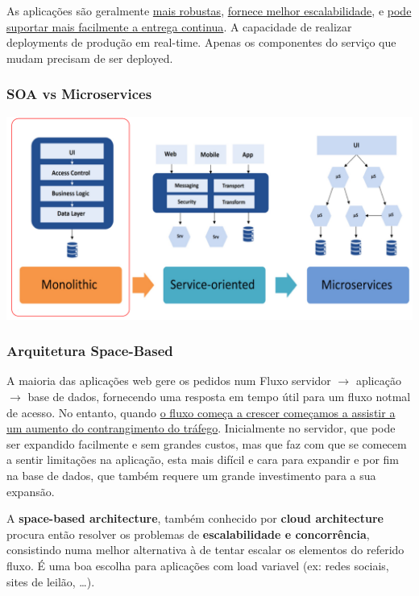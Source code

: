\documentclass{article}
\begin{document}
As aplicações são geralmente \uline{mais robustas}, \uline{fornece melhor escalabilidade}, e \uline{pode
suportar mais facilmente a entrega continua}. A capacidade de realizar
deployments de produção em real-time. Apenas os componentes do serviço
que mudam precisam de ser deployed.


\pagebreak


\subsubsection*{SOA vs Microservices}

\begin{center}
  \includegraphics[scale=0.5]{70}
\end{center}

\subsubsection{Arquitetura Space-Based}

A maioria das aplicações web gere os pedidos num Fluxo
servidor $\rightarrow$ aplicação $\rightarrow$ base de dados,
fornecendo uma resposta em tempo útil para um fluxo notmal de acesso.
No entanto, quando \uline{o fluxo começa a crescer começamos a assistir
a um aumento do contrangimento do tráfego}. Inicialmente no servidor, que pode ser expandido facilmente e
sem grandes custos, mas que faz com que se comecem a sentir limitações na aplicação, esta
mais difícil e cara para expandir e por fim na base de dados, que também requere um grande
investimento para a sua expansão.

\vspace{2mm}

A \textbf{space-based architecture}, também conhecido por \textbf{cloud architecture} procura então resolver
os problemas de \textbf{escalabilidade e concorrência}, consistindo numa melhor alternativa à de tentar
escalar os elementos do referido fluxo. É uma boa escolha para aplicações
com load variavel (ex: redes sociais, sites de leilão, \dots).
\end{document}
